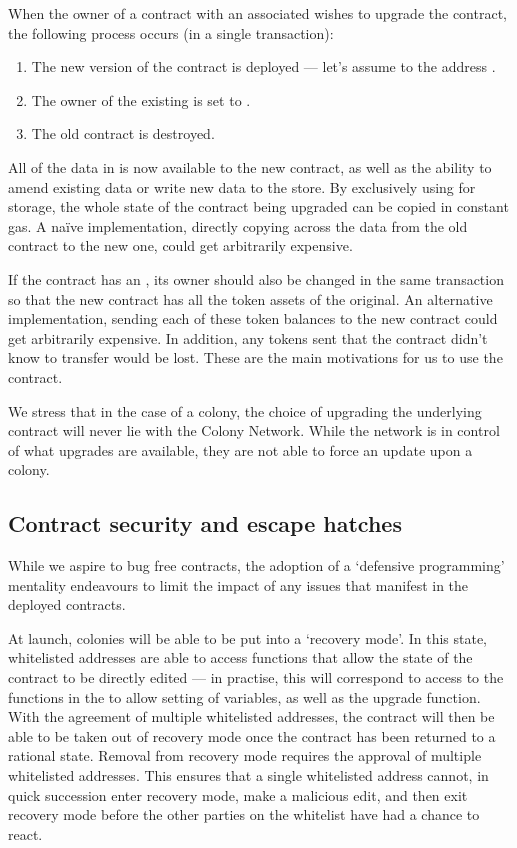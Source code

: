 When the owner of a contract with an associated  wishes to upgrade the contract, the following process occurs (in a single transaction):

\begin{enumerate}
\item The new version of the contract is deployed --- let's assume to the address .
\item The owner of the existing  is set to .
\item The old contract is destroyed.
\end{enumerate}

All of the data in  is now available to the new contract, as well as the ability to amend existing data or write new data to the store. By exclusively using  for storage, the whole state of the contract being upgraded can be copied in constant gas. A na{\"i}ve implementation, directly copying across the data from the old contract to the new one, could get arbitrarily expensive.

If the contract has an , its owner should also be changed in the same transaction so that the new contract has all the token assets of the original. An alternative implementation, sending each of these token balances to the new contract could get arbitrarily expensive. In addition, any tokens sent that the contract didn't know to transfer would be lost. These are the main motivations for us to use the  contract.

We stress that in the case of a colony, the choice of upgrading the underlying  contract will never lie with the Colony Network. While the network is in control of what upgrades are available, they are not able to force an update upon a colony.


\subsection{Contract security and escape hatches}\label{sec:escape-hatches}
While we aspire to bug free contracts, the adoption of a `defensive programming' mentality endeavours to limit the impact of any issues that manifest in the deployed contracts.

At launch, colonies will be able to be put into a `recovery mode'. In this state, whitelisted addresses are able to access functions that allow the state of the contract to be directly edited --- in practise, this will correspond to access to the functions in the  to allow setting of variables, as well as the upgrade function. With the agreement of multiple whitelisted addresses, the contract will then be able to be taken out of recovery mode once the contract has been returned to a rational state. Removal from recovery mode requires the approval of multiple whitelisted addresses. This ensures that a single whitelisted address cannot, in quick succession enter recovery mode, make a malicious edit, and then exit recovery mode before the other parties on the whitelist have had a chance to react.

